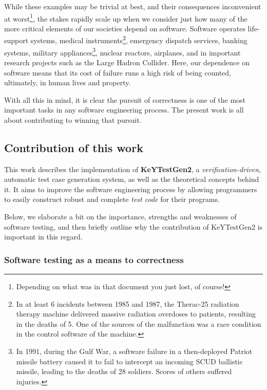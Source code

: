 \documentclass{article}
\newcommand{\tmem}[1]{{\em #1\/}}
\newcommand{\tmstrong}[1]{\textbf{#1}}
\begin{document}
While these examples may be trivial at best, and their consequences
inconvenient at worst{\footnote{Depending on what was in that document you
just lost, of course! }}, the stakes rapidly scale up when we consider just
how many of the more critical elements of our societies depend on software.
Software operates life-support systems, medical instruments{\footnote{In at
least 6 incidents between 1985 and 1987, the Therac-25 radiation therapy
machine delivered massive radiation overdoses to patients, resulting in the
deaths of 5. One of the sources of the malfunction was a race condition in the
control software of the machine.}}, emergency dispatch services, banking
systems, military appliances{\footnote{In 1991, during the Gulf War, a
software failure in a then-deployed Patriot missile battery caused it to fail
to intercept an incoming SCUD ballistic missile, leading to the deaths of 28
soldiers. Scores of others suffered injuries.}}, nuclear reactors, airplanes,
and in important research projects such as the Large Hadron Collider. Here,
our dependence on software means that its cost of failure runs a high risk of
being counted, ultimately, in human lives and property.



With all this in mind, it is clear the pursuit of correctness is one of the
most important tasks in any software engineering process. The present work is
all about contributing to winning that pursuit.



\subsection{Contribution of this work}

This work describes the implementation of {\tmstrong{KeYTestGen2}}, a
{\tmem{verification-driven}}, automatic test case generation system, as well
as the theoretical concepts behind it. It aims to improve the software
engineering process by allowing programmers to easily construct robust and
complete {\tmem{test code}} for their programs.



Below, we elaborate a bit on the importance, strengths and weaknesses of
software testing, and then briefly outline why the contribution of KeYTestGen2
is important in this regard.



\subsubsection{Software testing as a means to correctness}
\end{document}
